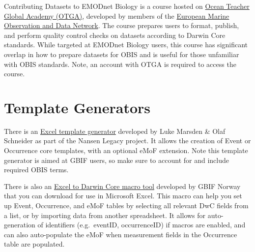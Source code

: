 \documentclass[
  letterpaper,
  DIV=11,
  numbers=noendperiod,
  oneside]{scrreprt}
\begin{document}
Contributing Datasets to EMODnet Biology is a course hosted on
\href{https://classroom.oceanteacher.org/}{Ocean Teacher Global Academy
(OTGA)}, developed by members of the
\href{https://emodnet.ec.europa.eu/en}{European Marine Observation and
Data Network}. The course prepares users to format, publish, and perform
quality control checks on datasets according to Darwin Core standards.
While targeted at EMODnet Biology users, this course has significant
overlap in how to prepare datasets for OBIS and is useful for those
unfamiliar with OBIS standards. Note, an account with OTGA is required
to access the course.

\hypertarget{template-generators}{%
\section{Template Generators}\label{template-generators}}

There is an
\href{https://www.nordatanet.no/aen/template-generator/config\%3DDarwin\%20Core}{Excel
template generator} developed by Luke Marsden \& Olaf Schneider as part
of the Nansen Legacy project. It allows the creation of Event or
Occurrence core templates, with an optional eMoF extension. Note this
template generator is aimed at GBIF users, so make sure to account for
and include required OBIS terms.

There is also an
\href{https://zenodo.org/record/6453921\#.Y9KsQkHMKmU}{Excel to Darwin
Core macro tool} developed by GBIF Norway that you can download for use
in Microsoft Excel. This macro can help you set up Event, Occurrence,
and eMoF tables by selecting all relevant DwC fields from a list, or by
importing data from another spreadsheet. It allows for auto-generation
of identifiers (e.g.~eventID, occurrenceID) if macros are enabled, and
can also auto-populate the eMoF when measurement fields in the
Occurrence table are populated.
\end{document}
